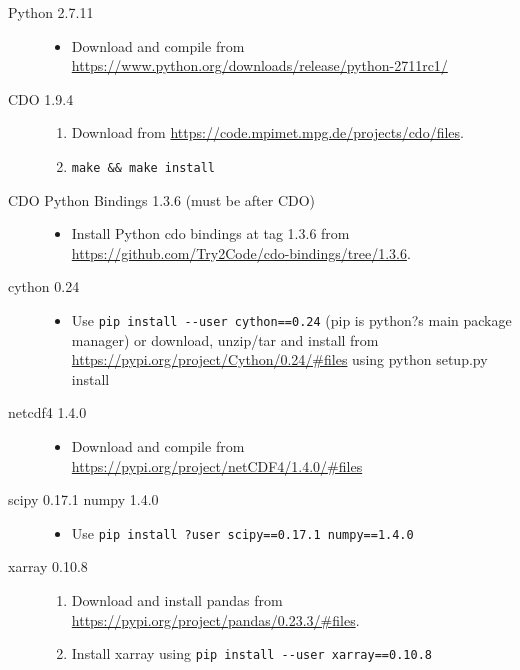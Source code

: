 \documentclass{article}
\begin{document}
\begin{description}
\item[Python 2.7.11] \hfill
\begin{itemize}
\item Download and compile from \\ \url{https://www.python.org/downloads/release/python-2711rc1/}
\end{itemize}
\item[CDO 1.9.4] \hfill
\begin{enumerate}
\item Download from \url{https://code.mpimet.mpg.de/projects/cdo/files}.
\item \lstinline[style=bash_input]{make && make install}
\end{enumerate}
\item[CDO Python Bindings 1.3.6 (must be after CDO)]\hfill
\begin{itemize}
\item Install Python cdo bindings at tag 1.3.6 from \url{https://github.com/Try2Code/cdo-bindings/tree/1.3.6}.
\end{itemize}
\item[cython 0.24] \hfill
\begin{itemize}
\item Use \lstinline[style=bash_input]{pip install --user cython==0.24} (pip is python?s main package manager) or download, unzip/tar and install from \url{https://pypi.org/project/Cython/0.24/#files} using python setup.py install
\end{itemize}
\item[netcdf4 1.4.0] \hfill
\begin{itemize}
\item Download and compile from \url{https://pypi.org/project/netCDF4/1.4.0/#files}
\end{itemize}
\item[scipy 0.17.1 numpy 1.4.0]\hfill
\begin{itemize}
\item Use \lstinline[style=bash_input]{pip install ?user scipy==0.17.1 numpy==1.4.0}
\end{itemize}
\item[xarray 0.10.8]\hfill
\begin{enumerate}
\item Download and install pandas from \url{https://pypi.org/project/pandas/0.23.3/#files}.
\item Install xarray using  \lstinline[style=bash_input]{pip install --user xarray==0.10.8}

\end{enumerate}
\end{description}
\end{document}
